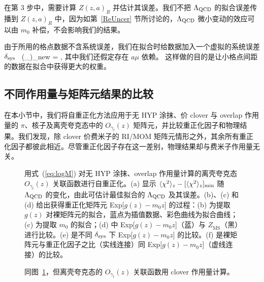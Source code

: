 在第 3 步中，需要计算 $Z(z,a)_{R}$ 并估计其误差。我们不把 $\Lambda_{\rm QCD}$ 的拟合误差传播到 $Z(z,a)_{R}$ 中，因为如第~\ref{ReUncer} 节所讨论的，$\Lambda_{\rm QCD}$ 微小变动的效应可以由 $m_{0}$ 补偿，不会影响我们的结果。

由于所用的格点数据不含系统误差，我们在拟合时给数据加入一个虚拟的系统误差 $\delta_{\rm sys}$~\cite{Zhang:2020rsx}
\bea\label{eq:error}
(\sigma_{\ln {}})_{\rm new} = ,
\eea
其中我们还假定存在 $a\mu$ 依赖。
这样做的目的是让小格点间距的数据在拟合中获得更大的权重。

\subsection{不同作用量与矩阵元结果的比较}\label{sec:cmpactions}

在本小节中，我们将自重正化方法应用于无 HYP 涂抹、价 clover 与 overlap 作用量的 $\pi$、核子及离壳夸克态中的 $O_{\gamma_t}(z)$ 矩阵元，并比较重正化因子和物理结果。我们发现，除 clover 价费米子的 RI/MOM 矩阵元情形之外，其余所有重正化因子都彼此相近。尽管重正化因子存在这一差别，物理结果却与费米子作用量无关。


\begin{figure}[tbp]
\centering
{}
\caption{
用式~(\ref{eq:logM}) 对无 HYP 涂抹、overlap 作用量计算的离壳夸克态 $O_{\gamma_t}(z)$ 关联函数进行自重正化。(a) 显示 $\langle  \chi^{2} \rangle_{z} - [\langle  \chi^{2} \rangle_{z}]_{\rm min}$ 随 $\Lambda_{\rm QCD}$ 的变化，由此可估计最佳拟合的 $\Lambda_{\rm QCD}$ 及其误差。(b)、(c) 和 (d) 给出获得重正化矩阵元 Exp[$g(z)-m_{0}z$] 的过程：(b) 为提取 $g(z)$ 对裸矩阵元的拟合，蓝点为插值数据、彩色曲线为拟合曲线；(c) 为提取 $m_{0}$ 的拟合；(d) 中 Exp[$g(z)-m_{0}z$]（蓝）与 $Z_{\overline{\mathrm{MS}}}$（黑）进行比较。(e) 是不同 $\delta_{\rm sys}$ 下 Exp[$g(z)-m_{0}z$] 的比较。(f) 是裸矩阵元与重正化因子之比（实线连接）同 Exp[$g(z)-m_{0}z$]（虚线连接）的比较。
}
\label{fig:Re_overlap_quark}
\end{figure}


\begin{figure}[tbp]
\centering
{}
\caption{
同图~\ref{fig:Re_overlap_quark}，但离壳夸克态的 $O_{\gamma_t}(z)$ 关联函数用 clover 作用量计算。
}
\label{fig:Re_clover_quark}
\end{figure}


